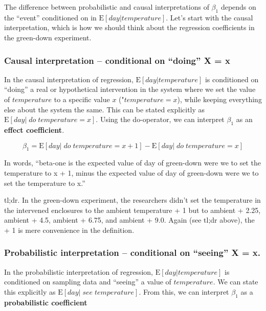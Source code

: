 \documentclass[]{book}
\begin{document}
The difference between probabilistic and causal interpretations of \(\beta_1\) depends on the ``event'' conditioned on in \(\textrm{E}[day|temperature]\). Let's start with the causal interpretation, which is how we should think about the regression coefficients in the green-down experiment.

\hypertarget{causal-interpretation-conditional-on-doing-x-x}{%
\subsubsection{Causal interpretation -- conditional on ``doing'' X = x}\label{causal-interpretation-conditional-on-doing-x-x}}

In the causal interpretation of regression, \(\textrm{E}[day|temperature]\) is conditioned on ``doing'' a real or hypothetical intervention in the system where we set the value of \(temperature\) to a specific value \(x\) ("\(temperature=x\)), while keeping everything else about the system the same. This can be stated explicitly as \(\textrm{E}[day|\;do\;temperature = x]\). Using the do-operator, we can interpret \(\beta_1\) as an \textbf{effect coefficient}.

\begin{equation}
\beta_1 = \textrm{E}[day|\;do\;temperature = x+1] - \textrm{E}[day|\;do\;temperature = x]
\end{equation}

In words, ``beta-one is the expected value of day of green-down were we to set the temperature to x + 1, minus the expected value of day of green-down were we to set the temperature to x.''

tl;dr. In the green-down experiment, the researchers didn't set the temperature in the intervened enclosures to the ambient temperature + 1 but to ambient + 2.25, ambient + 4.5, ambient + 6.75, and ambient + 9.0. Again (see tl;dr above), the + 1 is mere convenience in the definition.

\hypertarget{probabilistic-interpretation-conditional-on-seeing-x-x.}{%
\subsubsection{Probabilistic interpretation -- conditional on ``seeing'' X = x.}\label{probabilistic-interpretation-conditional-on-seeing-x-x.}}

In the probabilistic interpretation of regression, \(\textrm{E}[day|temperature]\) is conditioned on sampling data and ``seeing'' a value of \(temperature\). We can state this explicitly as \(\textrm{E}[day|\;see\;temperature]\). From this, we can interpret \(\beta_1\) as a \textbf{probabilistic coefficient}
\end{document}
